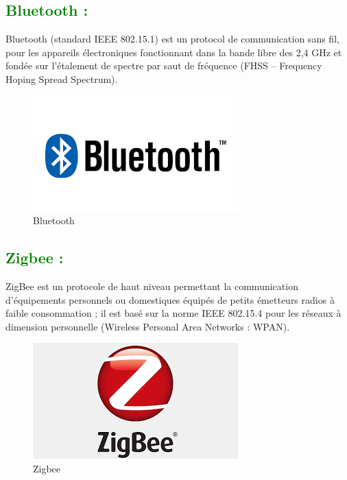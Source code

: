 \begin{flushleft}
	\subsection{\textcolor{green}{Bluetooth :}}
	Bluetooth (standard IEEE 802.15.1) est un protocol de
	communication sans fil, pour les appareils électroniques fonctionnant
	dans la bande libre des 2,4 GHz et fondée sur l’étalement de spectre par
	saut de fréquence (FHSS – Frequency Hoping Spread
	Spectrum).
	\begin{figure}[h]
		\centering
		\includegraphics{chapitres/images/Bluetoot.png}
		\caption{Bluetooth}
		\label{fig:labelname}
	\end{figure}
\newpage
	\subsection{\textcolor{green}{Zigbee :}}
	ZigBee est un protocole de haut niveau permettant la communication
	d'équipements personnels ou domestiques équipés de petits émetteurs
	radios à faible consommation ; il est basé sur la norme IEEE
	802.15.4 pour les réseaux à dimension personnelle (Wireless Personal
	Area Networks : WPAN).
	\begin{figure}[h]
		\centering
		\includegraphics{chapitres/images/Zigbee.png}
		\caption{Zigbee}
		\label{fig:labelname}
	\end{figure}


\end{flushleft}
